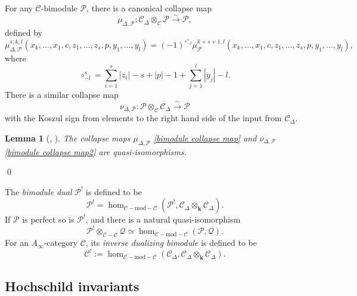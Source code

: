 \documentclass[11pt]{amsproc}
\def\K{{\mathbf{k}}}
\def\cP{\mathcal{P}}
\def\cQ{\mathcal{Q}}
\def\cc{\mathcal{C}}
\def\bimod{\mathrm{\!-\! mod\!-\!}}
\def\D{\Delta}
\def\ainf{A_\infty}
\newtheorem{lem}{Lemma}[section]
\theoremstyle{remark}
\numberwithin{equation}{section}
\begin{document}
For any $\cc$-bimodule $\cP$, there is a canonical collapse map
\begin{equation}\label{bimodule collapse map}
\mu_{\D, \cP}: \cc_{\D} \otimes_{\cc} \cP \stackrel{\sim}\to \cP,
\end{equation}
defined by 
\begin{equation}\label{bimodule collapse map formula}
\mu^{s; k, l}_{\D, \cP}(x_{k}, \ldots, x_{1}, c, z_{1}, \ldots, z_{s}, p, y_{1}, \ldots, y_{l}) = (-1)^{\circ^{s}_{-l}}\mu_{\cP}^{k+s+1, l}(x_{k}, \ldots, x_{1}, c, z_{1}, \ldots, z_{s}, p, y_{1}, \ldots, y_{l}),
\end{equation}
where
\begin{equation}
\circ^{s}_{-l} = \sum_{i=1}^{s} |z_{i}| - s + |p| - 1+ \sum_{j=1}^{l} |y_{j}| - l.
\end{equation}
There is a similar collapse map
\begin{equation}\label{bimodule collapse map2}
\nu_{\D, \cP}: \cP \otimes_{\cc} \cc_{\D} \stackrel{\sim}\to \cP
\end{equation}
with the Koszul sign from elements to the right hand side of the input from $\cc_{\D}$.

\begin{lem}[{\cite[Proposition 2.2]{ganatra}, \cite[Lemma 2.6]{GGV}}]\label{lem: collapse iso}
The collapse maps $\mu_{\D, \cP}$ \eqref{bimodule collapse map} and $\nu_{\D, \cP}$ \eqref{bimodule collapse map2} are quasi-isomorphisms.
\end{lem} \qed

The {\it bimodule dual} $\cP^{!}$ is defined to be
\begin{equation}
\cP^{!} = \hom_{\cc \bimod \cc}(\cP^{!}, \cc_{\D} \otimes_{\K} \cc_{\D}).
\end{equation}
If $\cP$ is perfect so is $\cP^{!}$, and there is a natural quasi-isomorphism
\begin{equation}
\cP^{!} \otimes_{\cc-\cc} \cQ \simeq \hom_{\cc \bimod \cc}(\cP, \cQ).
\end{equation}
For an $\ainf$-category $\cc$, its {\it inverse dualizing bimodule} is defined to be
\begin{equation}\label{inverse dualizing bimod}
\cc^{!}:= \hom_{\cc \bimod \cc}(\cc_{\D}, \cc_{\D} \otimes_{\K} \cc_{\D}).
\end{equation}

\subsection{Hochschild invariants} 
\end{document}
